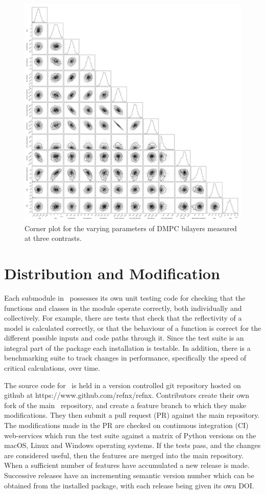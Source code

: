 \documentclass[12pt]{article}
\begin{document}
\begin{figure}
  \includegraphics[width=\linewidth]{./supporting_information/corner}
  \caption{Corner plot for the varying parameters of DMPC bilayers measured at three contrasts.}
  \label{fig:corner}
\end{figure}

 
\section*{Distribution and Modification}
Each submodule in \ possesses its own unit testing code for checking that the functions and classes in the module operate correctly, both individually and collectively. For example, there are tests that check that the reflectivity of a model is calculated correctly, or that the behaviour of a function is correct for the different possible inputs and code paths through it. Since the test suite is an integral part of the package each installation is testable. In addition, there is a benchmarking suite to track changes in performance, specifically the speed of critical calculations, over time.
 
 The source code for \ is held in a version controlled git repository hosted on github at https://www.github.com/refnx/refnx. Contributors create their own fork of the main \ repository, and create a feature branch to which they make modifications. They then submit a pull request (PR) against the main repository. The modifications made in the PR are checked on continuous integration (CI) web-services which run the test suite against a matrix of Python versions on the macOS, Linux and Windows operating systems. If the tests pass, and the changes are considered useful, then the features are merged into the main repository. When a sufficient number of features have accumulated a new release is made. Successive releases have an incrementing semantic version number which can be obtained from the installed package, with each release being given its own DOI.
\end{document}

